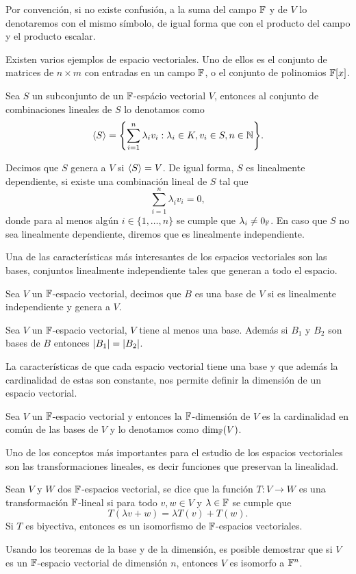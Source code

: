 \documentclass[11pt]{report}
\begin{document}
Por convención, si no existe confusión, a la suma del campo $\mathbb{F}$ y de $V$ lo denotaremos con el mismo símbolo, de igual forma que con el producto del campo y el producto escalar.

Existen varios ejemplos de espacio vectoriales. Uno de ellos es el conjunto de matrices de $n \times m $ con entradas en un campo $\mathbb{F}$, o el conjunto de polinomios $\mathbb{F}[x]$.

\begin{defi}
  Sea $S$ un subconjunto de un $\mathbb{F}$-espácio vectorial $V$, entonces al conjunto de combinaciones lineales de $S$ lo denotamos como
  \[ \inner{S} = \set{ \sum_{i=1}^n \lambda_i v_i : \lambda_i \in K,  v_i \in S, n \in \N  }. \]

  Decimos que $S$ genera a $V$ si $\langle S\rangle = V$. De igual forma, $S$ es linealmente dependiente, si existe una combinación lineal de $S$ tal que
  \[ \sum_{i=1}^n \lambda_i v_i = 0, \]
  donde para al menos algún $i \in \{1,\ldots,n\}$ se cumple que $\lambda_i \neq 0_{\mathbb{F}}$. En caso que $S$ no sea linealmente dependiente, diremos que es linealmente independiente.
\end{defi}

Una de las características más interesantes de los espacios vectoriales son las bases, conjuntos linealmente independiente tales que generan a todo el espacio.
\begin{defi}
  Sea $V$ un $\mathbb{F}$-espacio vectorial, decimos que $B$ es una base de $V$ si es linealmente independiente y genera a $V$.
\end{defi}

\begin{teor}
  Sea $V$ un $\mathbb{F}$-espacio vectorial, $V$ tiene al menos una base. Además si $B_1$ y $B_2$ son bases de $B$ entonces $\mathopen|B_1\mathclose| = \mathopen|B_2\mathclose|$.
\end{teor}

La características de que cada espacio vectorial tiene una base y que además la cardinalidad de estas son constante, nos permite definir la dimensión de un espacio vectorial.

\begin{defi}
  Sea $V$ un $\mathbb{F}$-espacio vectorial y entonces la $\mathbb{F}$-dimensión de $V$ es la cardinalidad en común de las bases de $V$ y lo denotamos como $\dim_{\mathbb{F}}(V)$.
\end{defi}

Uno de los conceptos más importantes para el estudio de los espacios vectoriales son las transformaciones lineales, es decir funciones que preservan la linealidad.

\begin{defi}
  Sean $V$ y $W$ dos $\mathbb{F}$-espacios vectorial, se dice que la función $T\colon V\to W$ es una transformación $\mathbb{F}$-lineal si para todo $v,w \in V$ y $\lambda \in \mathbb{F}$ se cumple que 
  \[ T(\lambda v + w) = \lambda T(v) + T(w).\]
  Si $T$ es biyectiva, entonces es un isomorfismo de $\mathbb{F}$-espacios vectoriales.
\end{defi}

Usando los teoremas de la base y de la dimensión, es posible demostrar que si $V$ es un $\mathbb{F}$-espacio vectorial de dimensión $n$, entonces $V$ es isomorfo a $\mathbb{F}^n$.
\end{document}
